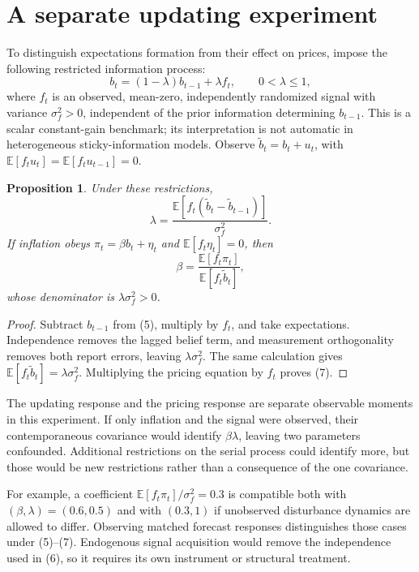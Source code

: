 \documentclass[11pt,a4paper]{article}
\newtheorem{proposition}[theorem]{Proposition}
\newcommand{\E}{\mathbb E}
\begin{document}
\section{A separate updating experiment}
To distinguish expectations formation from their effect on prices, impose the following restricted information process:
\[
 b_t=(1-\lambda)b_{t-1}+\lambda f_t,\qquad 0<\lambda\le1,
 \tag{5}
\]
where $f_t$ is an observed, mean-zero, independently randomized signal with variance $\sigma_f^2>0$, independent of the prior information determining $b_{t-1}$. This is a scalar constant-gain benchmark; its interpretation is not automatic in heterogeneous sticky-information models. Observe $\widetilde b_t=b_t+u_t$, with
$\E[f_tu_t]=\E[f_tu_{t-1}]=0$.

\begin{proposition}
Under these restrictions,
\[
 \lambda=\frac{\E[f_t(\widetilde b_t-\widetilde b_{t-1})]}{\sigma_f^2}.
 \tag{6}
\]
If inflation obeys $\pi_t=\beta b_t+\eta_t$ and $\E[f_t\eta_t]=0$, then
\[
 \beta=\frac{\E[f_t\pi_t]}{\E[f_t\widetilde b_t]},
 \tag{7}
\]
whose denominator is $\lambda\sigma_f^2>0$.
\end{proposition}
\begin{proof}
Subtract $b_{t-1}$ from (5), multiply by $f_t$, and take expectations. Independence removes the lagged belief term, and measurement orthogonality removes both report errors, leaving $\lambda\sigma_f^2$. The same calculation gives $\E[f_t\widetilde b_t]=\lambda\sigma_f^2$. Multiplying the pricing equation by $f_t$ proves (7).
\end{proof}
The updating response and the pricing response are separate observable moments in this experiment. If only inflation and the signal were observed, their contemporaneous covariance would identify $\beta\lambda$, leaving two parameters confounded. Additional restrictions on the serial process could identify more, but those would be new restrictions rather than a consequence of the one covariance.

For example, a coefficient $\E[f_t\pi_t]/\sigma_f^2=0.3$ is compatible both with $(\beta,\lambda)=(0.6,0.5)$ and with $(0.3,1)$ if unobserved disturbance dynamics are allowed to differ. Observing matched forecast responses distinguishes those cases under (5)--(7). Endogenous signal acquisition would remove the independence used in (6), so it requires its own instrument or structural treatment.
\end{document}
